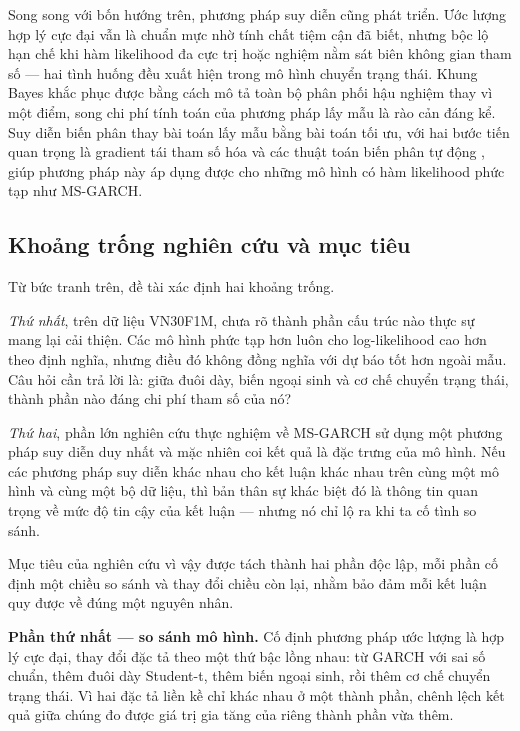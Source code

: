 \documentclass[12pt,a4paper]{article}
\numberwithin{equation}{section}
\theoremstyle{definition}
\begin{document}
Song song với bốn hướng trên, phương pháp suy diễn cũng phát triển. Ước lượng hợp lý cực
đại vẫn là chuẩn mực nhờ tính chất tiệm cận đã biết, nhưng bộc lộ hạn chế khi hàm
likelihood đa cực trị hoặc nghiệm nằm sát biên không gian tham số --- hai tình huống đều
xuất hiện trong mô hình chuyển trạng thái. Khung Bayes khắc phục được bằng cách mô tả
toàn bộ phân phối hậu nghiệm thay vì một điểm, song chi phí tính toán của phương pháp lấy
mẫu là rào cản đáng kể. Suy diễn biến phân \cite{blei2017} thay bài toán lấy mẫu bằng bài
toán tối ưu, với hai bước tiến quan trọng là gradient tái tham số hóa
\cite{kingma2014} và các thuật toán biến phân tự động \cite{kucukelbir2017}, giúp phương
pháp này áp dụng được cho những mô hình có hàm likelihood phức tạp như MS-GARCH.

\subsection{Khoảng trống nghiên cứu và mục tiêu}\label{subsec:objectives}
Từ bức tranh trên, đề tài xác định hai khoảng trống.

\emph{Thứ nhất}, trên dữ liệu VN30F1M, chưa rõ thành phần cấu trúc nào thực sự mang lại
cải thiện. Các mô hình phức tạp hơn luôn cho log-likelihood cao hơn theo định nghĩa, nhưng
điều đó không đồng nghĩa với dự báo tốt hơn ngoài mẫu. Câu hỏi cần trả lời là: giữa đuôi
dày, biến ngoại sinh và cơ chế chuyển trạng thái, thành phần nào đáng chi phí tham số của
nó?

\emph{Thứ hai}, phần lớn nghiên cứu thực nghiệm về MS-GARCH sử dụng một phương pháp suy
diễn duy nhất và mặc nhiên coi kết quả là đặc trưng của mô hình. Nếu các phương pháp suy
diễn khác nhau cho kết luận khác nhau trên cùng một mô hình và cùng một bộ dữ liệu, thì
bản thân sự khác biệt đó là thông tin quan trọng về mức độ tin cậy của kết luận --- nhưng
nó chỉ lộ ra khi ta cố tình so sánh.

Mục tiêu của nghiên cứu vì vậy được tách thành hai phần độc lập, mỗi phần cố định một
chiều so sánh và thay đổi chiều còn lại, nhằm bảo đảm mỗi kết luận quy được về đúng một
nguyên nhân.

\textbf{Phần thứ nhất --- so sánh mô hình.} Cố định phương pháp ước lượng là hợp lý cực
đại, thay đổi đặc tả theo một thứ bậc lồng nhau: từ GARCH với sai số chuẩn, thêm đuôi dày
Student-t, thêm biến ngoại sinh, rồi thêm cơ chế chuyển trạng thái. Vì hai đặc tả liền kề
chỉ khác nhau ở một thành phần, chênh lệch kết quả giữa chúng đo được giá trị gia tăng
của riêng thành phần vừa thêm.
\end{document}
